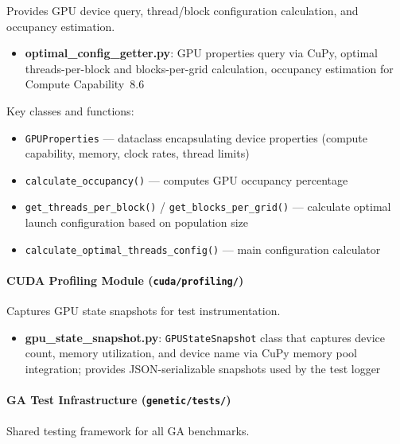 \documentclass[a4paper,14pt]{extarticle}
\begin{document}
Provides GPU device query, thread/block configuration calculation, and occupancy estimation.

\begin{itemize}
  \item \textbf{optimal\_config\_getter.py}: GPU properties query via CuPy, optimal
        threads-per-block and blocks-per-grid calculation, occupancy estimation for
        Compute Capability~8.6
\end{itemize}

Key classes and functions:
\begin{itemize}
  \item \texttt{GPUProperties} --- dataclass encapsulating device properties (compute
        capability, memory, clock rates, thread limits)
  \item \texttt{calculate\_occupancy()} --- computes GPU occupancy percentage
  \item \texttt{get\_threads\_per\_block()} / \texttt{get\_blocks\_per\_grid()} ---
        calculate optimal launch configuration based on population size
  \item \texttt{calculate\_optimal\_threads\_config()} --- main configuration calculator
\end{itemize}

\paragraph{CUDA Profiling Module (\texttt{cuda/profiling/})}

Captures GPU state snapshots for test instrumentation.

\begin{itemize}
  \item \textbf{gpu\_state\_snapshot.py}: \texttt{GPUStateSnapshot} class that captures
        device count, memory utilization, and device name via CuPy memory pool integration;
        provides JSON-serializable snapshots used by the test logger
\end{itemize}

\paragraph{GA Test Infrastructure (\texttt{genetic/tests/})}

Shared testing framework for all GA benchmarks.
\end{document}
